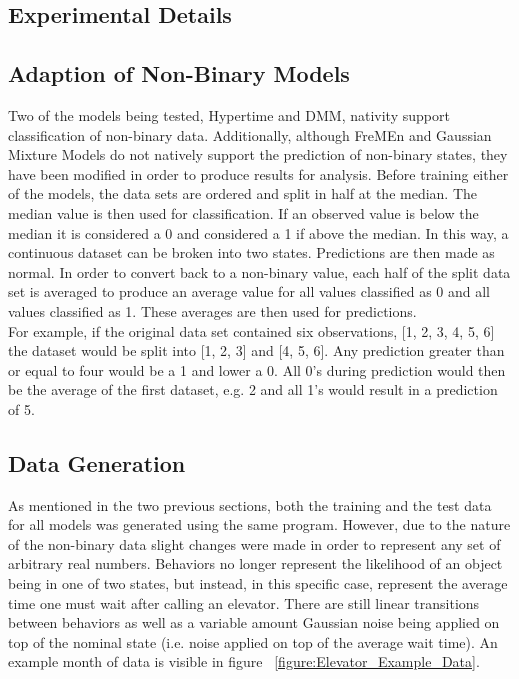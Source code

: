   \subsection{ Experimental Details }

  \subsection{ Adaption of Non-Binary Models }

  Two of the models being tested, Hypertime and DMM, nativity support
  classification of non-binary data. Additionally, although FreMEn and Gaussian Mixture Models
  do not natively support the prediction of non-binary states, they have been
  modified in order to produce results for analysis. Before training either of
  the models, the data sets are ordered and split in half at the median. The
  median value is then used for classification. If an observed value is below
  the median it is considered a 0 and considered a 1 if above the median. In this way, a continuous
  dataset can be broken into two states. Predictions are then made as normal.
  In order to convert back to a non-binary value, each half of the split data
  set is averaged to produce an average value for all values classified as 0 and
  all values classified as 1. These averages are then used for predictions. \\

  For example, if the original data set contained six observations,
  [1, 2, 3, 4, 5, 6] the dataset would be split into [1, 2, 3] and [4, 5, 6].
  Any prediction greater than or equal to four would be a 1 and lower a 0. All 0's during
  prediction would then be the average of the first dataset, e.g. 2 and all
  1's would result in a prediction of 5. \\

  \subsection{ Data Generation }

  As mentioned in the two previous sections, both the training and the test
  data for all models was generated using the same program. However,
  due to the nature of the non-binary data slight changes were made in order
  to represent any set of arbitrary real numbers. Behaviors no longer represent
  the likelihood of an object being in one of two states, but instead, in this
  specific case, represent the average time one must wait after calling an
  elevator. There are still linear transitions between behaviors as well as
  a variable amount Gaussian noise being applied on top of the nominal state
  (i.e. noise applied on top of the average wait time). An example month
  of data is visible in figure ~\ref{figure:Elevator_Example_Data}.


